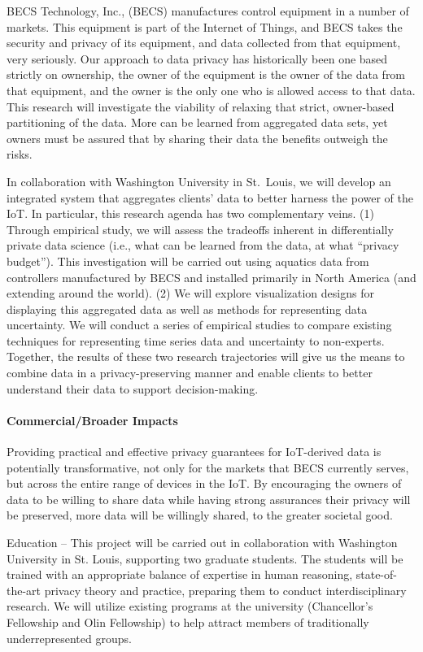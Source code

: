 BECS Technology, Inc., (BECS) manufactures control equipment in a
number of markets.
This equipment is part of the Internet of Things, and BECS takes the
security and privacy of its equipment, and data collected from that
equipment, very seriously.
Our approach to data privacy has historically been one based strictly 
on ownership, the owner of the equipment is the owner of the data from
that equipment, and the owner is the only one who is allowed access to
that data.
This research will investigate the viability of relaxing that strict,
owner-based partitioning of the data.  More can be learned from aggregated
data sets, yet owners must be assured that by sharing their data the
benefits outweigh the risks.

In collaboration with Washington University in St.~Louis, we will develop an integrated system that aggregates clients' data to better harness the power of the IoT.  
In particular, this research agenda has two complementary veins. (1) 
Through empirical study,
we will assess the tradeoffs inherent in differentially private 
data science (i.e., what can be learned from the data, at what ``privacy
budget'').
This investigation will be carried out using aquatics data from
controllers manufactured by BECS and installed primarily in North America
(and extending around the world).
(2) We will explore visualization designs for displaying this aggregated data as well as methods for representing data uncertainty. 
We will conduct a series of empirical studies to compare existing techniques for representing time series data and uncertainty to non-experts. 
Together, the results of these two research trajectories will give us the means to combine data in a privacy-preserving manner and enable clients to better understand their data to support decision-making.  



\medskip

\paragraph{Commercial/Broader Impacts}
Providing practical and effective privacy guarantees for IoT-derived data
is potentially transformative, not only for the markets that BECS currently
serves, but across the entire range of devices in the IoT.
By encouraging the owners of data to be willing to share data while having
strong assurances their privacy will be preserved, more data will be
willingly shared, to the greater societal good.

Education -- This project will be carried out in collaboration with
Washington University in St. Louis, supporting two graduate students.
The students will be trained with an appropriate balance of expertise in human reasoning, state-of-the-art privacy theory and practice, preparing them to conduct interdisciplinary research.
We will utilize existing programs at the university (Chancellor's
Fellowship and Olin Fellowship) to help attract members of traditionally
underrepresented groups.
